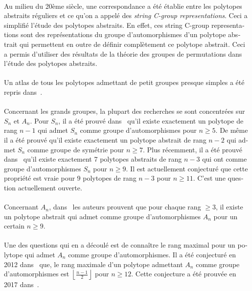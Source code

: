\begin{otherlanguage}{french}
\paragraph{}
Au milieu du 20ème siècle, une correspondance a été établie entre les polytopes abstraits réguliers et ce qu'on a appelé des \textit{string C-group representations}. Ceci a simplifié l'étude des polytopes abstraits. En effet, ces string C-group representations sont des représentations du groupe d'automorphismes d'un polytope abstrait qui permettent en outre de définir complètement ce polytope abstrait. Ceci a permis d'utiliser des résultats de la théorie des groupes de permutations dans l'étude des polytopes abstraits.

\paragraph{}
Un atlas de tous les polytopes admettant de petit groupes presque simples a été repris dans~\cite{atlasPolytopes}.

\paragraph{}
Concernant les grands groupes, la plupart des recherches se sont concentrées sur $S_n$ et $A_n$. Pour $S_n$, il a été prouvé dans~\cite{highRankSym} qu'il existe exactement un polytope de rang $n-1$ qui admet $S_n$ comme groupe d'automorphismes pour $n \ge 5$. De même il a été prouvé qu'il existe exactement un polytope abstrait de rang $n-2$ qui admet $S_n$ comme groupe de symétrie pour $n \ge 7$. Plus récemment, il a été prouvé dans~\cite{leemansTransactions} qu'il existe exactement 7 polytopes abstraits de rang $n-3$ qui ont comme groupe d'automorphismes $S_n$ pour $n \ge 9$. Il est actuellement conjecturé que cette propriété est vraie pour 9 polytopes de rang $n-3$ pour $n \ge 11$. C'est une question actuellement ouverte.

\paragraph{}
Concernant $A_n$, dans~\cite{highRankAlternating} les auteurs prouvent que pour chaque rang $\ge 3$, il existe un polytope abstrait qui admet comme groupe d'automorphismes $A_n$ pour un certain $n \ge 9$.

\paragraph{}
Une des questions qui en a découlé est de connaître le rang maximal pour un polytope qui admet $A_n$ comme groupe d'automorphismes. Il a été conjecturé en 2012 dans~\cite{A12PolytopesRank} que, le rang maximale d'un polytope admettant $A_n$ comme groupe d'automorphismes est $\left\lfloor\frac{n-1}{2}\right\rfloor$ pour $n \ge 12$. Cette conjecture a été prouvée en 2017 dans~\cite{highestRankOfAn}.


\end{otherlanguage}
